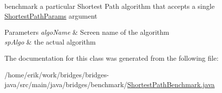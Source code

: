 benchmark a particular Shortest Path algorithm that accepts a single \hyperlink{classbridges_1_1benchmark_1_1_shortest_path_params}{Shortest\+Path\+Params} argument 


\begin{DoxyParams}{Parameters}
{\em algo\+Name} & Screen name of the algorithm \\
\hline
{\em sp\+Algo} & the actual algorithm \\
\hline
\end{DoxyParams}


The documentation for this class was generated from the following file\+:\begin{DoxyCompactItemize}
\item 
/home/erik/work/bridges/bridges-\/java/src/main/java/bridges/benchmark/\hyperlink{_shortest_path_benchmark_8java}{Shortest\+Path\+Benchmark.\+java}\end{DoxyCompactItemize}
